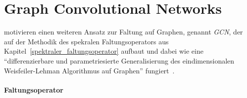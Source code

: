 \section{Graph Convolutional Networks}
\label{graph_convolutional_networks}

\citeauthor{gcn} motivieren einen weiteren Ansatz zur Faltung auf Graphen, genannt \emph{\gls{GCN}}, der auf der Methodik des spekralen Faltungsoperators aus Kapitel~\ref{spektraler_faltungsoperator} aufbaut und dabei wie eine \enquote{differenzierbare und parametriesierte Generalisierung des eindimensionalen Weisfeiler-Lehman Algorithmus auf Graphen} fungiert~\cite{gcn}.

\paragraph{Faltungsoperator}
\label{gcn_faltungsoperator}

